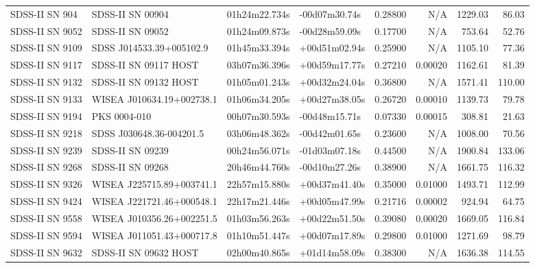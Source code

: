 \begin{longtable}{llllrrrr}
SDSS-II SN 904   &                SDSS-II SN 00904 &   01h24m22.734s &   -00d07m30.74s &  0.28800 &      N/A &  1229.03 &       86.03 \\
SDSS-II SN 9052  &                SDSS-II SN 09052 &   01h24m09.873s &   -00d28m59.09s &  0.17700 &      N/A &   753.64 &       52.76 \\
SDSS-II SN 9109  &        SDSS J014533.39+005102.9 &   01h45m33.394s &   +00d51m02.94s &  0.25900 &      N/A &  1105.10 &       77.36 \\
SDSS-II SN 9117  &           SDSS-II SN 09117 HOST &   03h07m36.396s &   +00d59m17.77s &  0.27210 &  0.00020 &  1162.61 &       81.39 \\
SDSS-II SN 9132  &           SDSS-II SN 09132 HOST &   01h05m01.243s &   +00d32m24.04s &  0.36800 &      N/A &  1571.41 &      110.00 \\
SDSS-II SN 9133  &       WISEA J010634.19+002738.1 &   01h06m34.205s &   +00d27m38.05s &  0.26720 &  0.00010 &  1139.73 &       79.78 \\
SDSS-II SN 9194  &                    PKS 0004-010 &   00h07m30.593s &   -00d48m15.71s &  0.07330 &  0.00015 &   308.81 &       21.63 \\
SDSS-II SN 9218  &        SDSS J030648.36-004201.5 &   03h06m48.362s &   -00d42m01.65s &  0.23600 &      N/A &  1008.00 &       70.56 \\
SDSS-II SN 9239  &                SDSS-II SN 09239 &   00h24m56.071s &   -01d03m07.18s &  0.44500 &      N/A &  1900.84 &      133.06 \\
SDSS-II SN 9268  &                SDSS-II SN 09268 &   20h46m44.760s &   -00d10m27.26s &  0.38900 &      N/A &  1661.75 &      116.32 \\
SDSS-II SN 9326  &       WISEA J225715.89+003741.1 &   22h57m15.880s &   +00d37m41.40s &  0.35000 &  0.01000 &  1493.71 &      112.99 \\
SDSS-II SN 9424  &       WISEA J221721.46+000548.1 &   22h17m21.446s &   +00d05m47.99s &  0.21716 &  0.00002 &   924.94 &       64.75 \\
SDSS-II SN 9558  &       WISEA J010356.26+002251.5 &   01h03m56.263s &   +00d22m51.50s &  0.39080 &  0.00020 &  1669.05 &      116.84 \\
SDSS-II SN 9594  &       WISEA J011051.43+000717.8 &   01h10m51.447s &   +00d07m17.89s &  0.29800 &  0.01000 &  1271.69 &       98.79 \\
SDSS-II SN 9632  &           SDSS-II SN 09632 HOST &   02h00m40.865s &   +01d14m58.09s &  0.38300 &      N/A &  1636.38 &      114.55 \\

\end{longtable}
